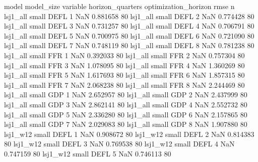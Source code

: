             model model_size variable  horizon_quarters optimization_horizon     rmse  n
         lsj1_all      small     DEFL                 1                  NaN 0.881658 80
         lsj1_all      small     DEFL                 2                  NaN 0.774428 80
         lsj1_all      small     DEFL                 3                  NaN 0.731257 80
         lsj1_all      small     DEFL                 4                  NaN 0.706791 80
         lsj1_all      small     DEFL                 5                  NaN 0.700975 80
         lsj1_all      small     DEFL                 6                  NaN 0.721090 80
         lsj1_all      small     DEFL                 7                  NaN 0.748119 80
         lsj1_all      small     DEFL                 8                  NaN 0.781238 80
         lsj1_all      small      FFR                 1                  NaN 0.392033 80
         lsj1_all      small      FFR                 2                  NaN 0.757304 80
         lsj1_all      small      FFR                 3                  NaN 1.078095 80
         lsj1_all      small      FFR                 4                  NaN 1.360269 80
         lsj1_all      small      FFR                 5                  NaN 1.617693 80
         lsj1_all      small      FFR                 6                  NaN 1.857315 80
         lsj1_all      small      FFR                 7                  NaN 2.068238 80
         lsj1_all      small      FFR                 8                  NaN 2.244469 80
         lsj1_all      small      GDP                 1                  NaN 2.652957 80
         lsj1_all      small      GDP                 2                  NaN 2.437999 80
         lsj1_all      small      GDP                 3                  NaN 2.862141 80
         lsj1_all      small      GDP                 4                  NaN 2.552732 80
         lsj1_all      small      GDP                 5                  NaN 2.336280 80
         lsj1_all      small      GDP                 6                  NaN 2.157865 80
         lsj1_all      small      GDP                 7                  NaN 2.029083 80
         lsj1_all      small      GDP                 8                  NaN 1.907880 80
         lsj1_w12      small     DEFL                 1                  NaN 0.908672 80
         lsj1_w12      small     DEFL                 2                  NaN 0.814383 80
         lsj1_w12      small     DEFL                 3                  NaN 0.769538 80
         lsj1_w12      small     DEFL                 4                  NaN 0.747159 80
         lsj1_w12      small     DEFL                 5                  NaN 0.746113 80
